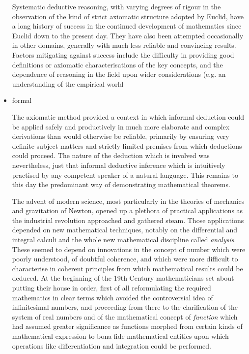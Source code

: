 \documentclass[10pt,titlepage]{book}
\begin{document}
\begin{itemize}
  Systematic deductive reasoning, with varying degrees of rigour in the observation of the kind of strict axiomatic structure adopted by Euclid, have a long history of success in the continued development of mathematics since Euclid down to the present day.
  They have also been attempted occasionally in other domains, generally with much less reliable and convincing results.
 Factors mitigating against success include the difficulty in providing good definitions or axiomatic characterisations of the key concepts, and the dependence of reasoning in the field upon wider considerations (e.g. an understanding of the empirical world
   
\item formal 

  The axiomatic method provided a context in which informal deduction could be applied safely and productively in much more elaborate and complex derivations than would otherwise be reliable, primarily by ensuring very definite subject matters and strictly limited premises from which deductions could proceed.
  The nature of the deduction which is involved was nevertheless, just that informal deductive inference which is intuitively practised by any competent speaker of a natural language.
  This remains to this day the predominant way of demonstrating mathematical theorems.

  The advent of modern science, most particularly in the theories of mechanics and gravitation of Newton, opened up a plethora of practical applications as the industrial revolution approached and gathered steam.
  Those applications depended on new mathematical techniques, notably on the differential and integral calculi and the whole new mathematical discipline called \emph{analysis}.
  These seemed to depend on innovations in the concept of number which were poorly understood, of doubtful coherence, and which were more difficult to characterise in coherent principles from which mathematical results could be deduced.
  At the beginning of the 19th Century mathematicians set about putting their house in order, first of all reformulating the required mathematics in clear terms which avoided the controversial idea of infinitesimal numbers, and proceeding from there to the clarification of the system of real numbers and of the mathematical concept of \emph{function} which had assumed greater significance as functions morphed from certain kinds of mathematical expression to bona-fide mathematical entities upon which operations like differentiation and integration could be performed.


\end{itemize}
\end{document}
